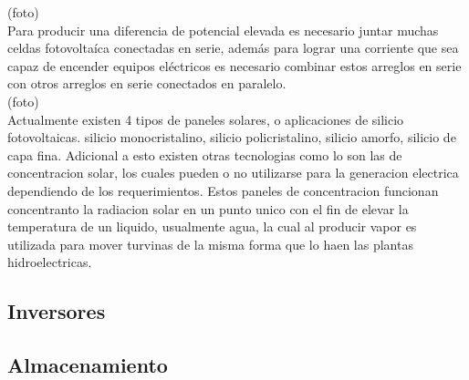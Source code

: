 (foto)\\

Para producir una diferencia de potencial elevada es necesario juntar muchas celdas fotovoltaíca conectadas en serie, además para lograr una corriente que sea capaz de encender equipos eléctricos es necesario combinar estos arreglos en serie con otros arreglos en serie conectados en paralelo.\\

(foto)\\

Actualmente existen 4 tipos de paneles solares, o aplicaciones de silicio fotovoltaicas. silicio monocristalino, silicio policristalino, silicio amorfo, silicio de capa fina. Adicional a esto existen otras tecnologias como lo son las de concentracion solar, los cuales pueden o no utilizarse para la generacion electrica dependiendo de los requerimientos. Estos paneles de concentracion funcionan concentranto la radiacion solar en un punto unico con el fin de elevar la temperatura de un liquido, usualmente agua, la cual al producir vapor es utilizada para mover turvinas de la misma forma que lo haen las plantas hidroelectricas.

\subsection{Inversores}

\subsection{Almacenamiento}

